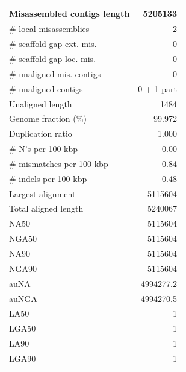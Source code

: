 \documentclass[12pt,a4paper]{article}
\begin{document}
\begin{table}[ht]
\begin{center}
\begin{tabular}{|l*{1}{|r}|}
Misassembled contigs length & 5205133 \\ \hline
\# local misassemblies & 2 \\ \hline
\# scaffold gap ext. mis. & 0 \\ \hline
\# scaffold gap loc. mis. & 0 \\ \hline
\# unaligned mis. contigs & 0 \\ \hline
\# unaligned contigs & 0 + 1 part \\ \hline
Unaligned length & 1484 \\ \hline
Genome fraction (\%) & 99.972 \\ \hline
Duplication ratio & 1.000 \\ \hline
\# N's per 100 kbp & 0.00 \\ \hline
\# mismatches per 100 kbp & 0.84 \\ \hline
\# indels per 100 kbp & 0.48 \\ \hline
Largest alignment & 5115604 \\ \hline
Total aligned length & 5240067 \\ \hline
NA50 & 5115604 \\ \hline
NGA50 & 5115604 \\ \hline
NA90 & 5115604 \\ \hline
NGA90 & 5115604 \\ \hline
auNA & 4994277.2 \\ \hline
auNGA & 4994270.5 \\ \hline
LA50 & 1 \\ \hline
LGA50 & 1 \\ \hline
LA90 & 1 \\ \hline
LGA90 & 1 \\ \hline
\end{tabular}
\end{center}
\end{table}
\end{document}
